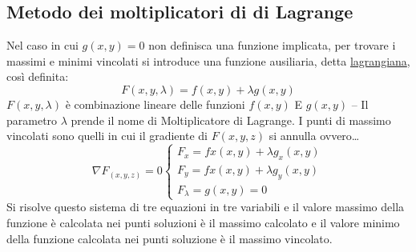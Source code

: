 \subsection{Metodo dei moltiplicatori di di Lagrange}
Nel caso in cui $g(x,y)=0$ non definisca una funzione implicata, per trovare i
massimi e minimi vincolati si introduce una funzione ausiliaria, detta
\underline{\color{red}lagrangiana}, così definita:
\begin{equation}
	F(x,y,\lambda)=f(x,y)+\lambda g(x,y)
\end{equation}
$F(x,y,\lambda)$ è combinazione lineare delle funzioni $f(x,y)$ E $g(x,y)$ --
Il parametro $\lambda$ prende il nome di {\color{red}Moltiplicatore di
Lagrange}. I punti di massimo vincolati sono quelli in cui il gradiente di
$F(x,y,z)$ si annulla ovvero\dots
\begin{equation}
	\nabla F_{(x,y,z)}=0 \begin{cases}
		F_x=fx(x,y)+\lambda g_x(x,y)\\
		F_y=fx(x,y)+\lambda g_y(x,y)\\
		F_\lambda=g(x,y)=0
	\end{cases}
\end{equation}
Si risolve questo sistema di tre equazioni in tre variabili e il valore massimo
della funzione è calcolata nei punti soluzioni è il massimo calcolato e il
valore minimo della funzione calcolata nei punti soluzione è il massimo
vincolato.
